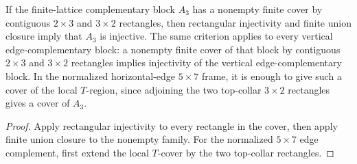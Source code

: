 \begin{lemma}%
    \label{lem:peps_normalSquareEdgeComplementRegion_injective_of_cover}
    \leanok
    If the finite-lattice complementary block $A_3$ has a nonempty finite
    cover by contiguous $2\times3$ and $3\times2$ rectangles, then
    rectangular injectivity and finite union closure imply that $A_3$ is
    injective. The same criterion applies to every vertical edge-complementary
    block: a nonempty finite cover of that block by contiguous $2\times3$ and
    $3\times2$ rectangles implies injectivity of the vertical
    edge-complementary block. In the normalized horizontal-edge $5\times7$
    frame, it is enough to give such a cover of the local $T$-region, since
    adjoining the two top-collar $3\times2$ rectangles gives a cover of $A_3$.
\end{lemma}
\begin{proof}\leanok
    Apply rectangular injectivity to every rectangle in the cover, then apply
    finite union closure to the nonempty family. For the normalized
    $5\times7$ edge complement, first extend the local $T$-cover by the
    two top-collar rectangles.
\end{proof}


